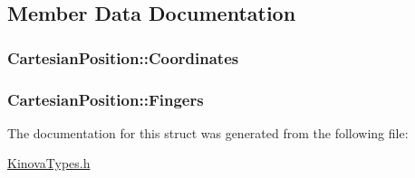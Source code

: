 \subsection{Member Data Documentation}
\hypertarget{struct_cartesian_position_aa1e120e383c650f4c4bf88ba8c780ab1}{
\subsubsection[{Coordinates}]{ Cartesian\-Position\-::\-Coordinates}}\label{struct_cartesian_position_aa1e120e383c650f4c4bf88ba8c780ab1}
\hypertarget{struct_cartesian_position_ad0d8710c54bb2f63dfc98d809eaeb3a4}{
\subsubsection[{Fingers}]{ Cartesian\-Position\-::\-Fingers}}\label{struct_cartesian_position_ad0d8710c54bb2f63dfc98d809eaeb3a4}


The documentation for this struct was generated from the following file\-:\begin{DoxyCompactItemize}
\item 
\hyperlink{_kinova_types_8h}{Kinova\-Types.\-h}\end{DoxyCompactItemize}
